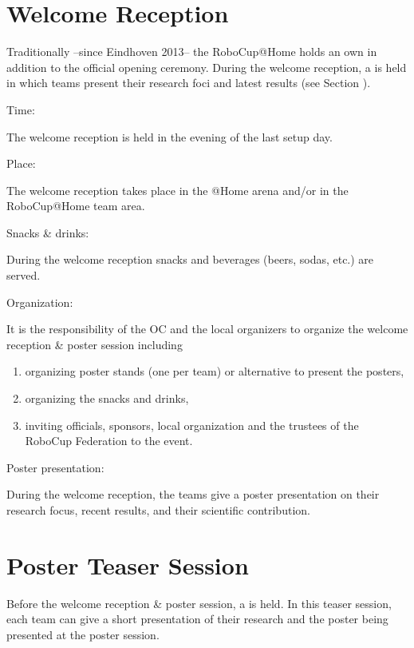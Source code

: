 \section{Welcome Reception}
\label{sec:welcome_recepion}
Traditionally --since Eindhoven 2013-- the RoboCup@Home holds an own  in addition to the official opening ceremony. During the welcome reception, a  is held in which teams present their research foci and latest results (see Section ).
\begin{enumerate}
	{\bf\item Time:} The welcome reception is held in the evening of the last setup day.
	{\bf\item Place:} The welcome reception takes place in the @Home arena and/or in the RoboCup@Home team area.
	{\bf\item Snacks \& drinks:} During the welcome reception snacks and beverages (beers, sodas, etc.) are served.
	{\bf\item Organization:} It is the responsibility of the OC and the local organizers to organize the welcome reception \& poster session including
		\begin{enumerate}
			\item organizing poster stands (one per team) or alternative to present the posters,
			\item organizing the snacks and drinks,
			\item inviting officials, sponsors, local organization and the trustees of the RoboCup Federation to the event.
		\end{enumerate}
	{\bf\item Poster presentation:} During the welcome reception, the teams give a poster presentation on their research focus, recent results, and their scientific contribution.
\end{enumerate}

\section{Poster Teaser Session}
\label{sec:poster_teaser_session}
Before the welcome reception \& poster session, a  is held. In this teaser session, each team can give a short presentation of their research and the poster being presented at the poster session.


